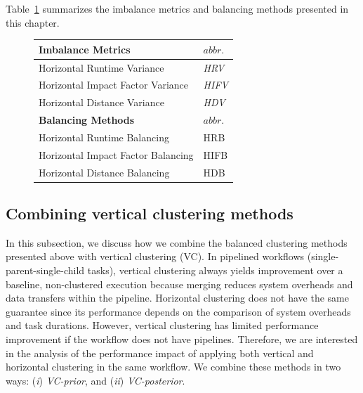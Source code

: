 Table~\ref{tab:2} summarizes the imbalance metrics and balancing methods presented in this chapter. 

\begin{figure}[htb]
	\centering
	\small
	\begin{tabular}{l|l}
		\hline
		\textbf{Imbalance Metrics} & $abbr.$   \\
		\hline
		Horizontal Runtime Variance & \emph{HRV}   \\ 
		Horizontal Impact Factor Variance & \emph{HIFV} \\ 
		Horizontal Distance Variance & \emph{HDV}  \\ 
		\hline
		\textbf{Balancing Methods} & $abbr.$  \\
		\hline
		Horizontal Runtime Balancing & HRB   \\ 
		Horizontal Impact Factor Balancing & HIFB\\ 
		Horizontal Distance Balancing & HDB \\ 
		\hline
	\end{tabular}
	\label{tab:2}
\end{figure}



\subsection{Combining vertical clustering methods}

In this subsection, we discuss how we combine the balanced clustering methods presented above with vertical clustering (VC).
In pipelined workflows (single-parent-single-child tasks), vertical clustering always yields improvement over a baseline, non-clustered execution because merging reduces system overheads and data transfers within the pipeline. Horizontal clustering does not have the same guarantee since its performance depends on the comparison of system overheads and task durations. However, vertical clustering has limited performance improvement if the workflow does not have pipelines. Therefore, we are interested in the analysis of the performance impact of applying both vertical and horizontal clustering in the same workflow. We combine these methods in two ways: (\emph{i}) \emph{VC-prior}, and (\emph{ii}) \emph{VC-posterior}.


